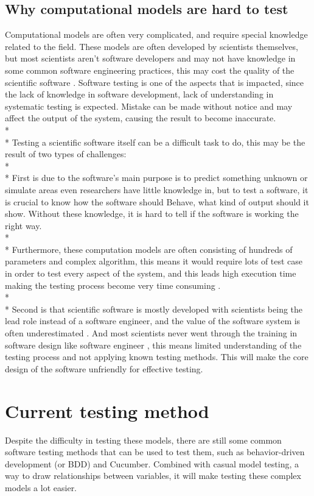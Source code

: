 \subsection{Why computational models are hard to test}
Computational models are often very complicated, and require special knowledge related to the field. These models are often developed by scientists themselves, but most scientists aren’t software developers and may not have knowledge in some common software engineering practices, this may cost the quality of the scientific software \cite{Reference6}. Software testing is one of the aspects that is impacted, since the lack of knowledge in software development, lack of understanding in systematic testing is expected. Mistake can be made without notice and may affect the output of the system, causing the result to become inaccurate.\\*\\*
Testing a scientific software itself can be a difficult task to do, this may be the result of two types of challenges: \\*\\*
First is due to the software’s main purpose is to predict something unknown or simulate areas even researchers have little knowledge in, but to test a software, it is crucial to know how the software should Behave, what kind of output should it show. 
Without these knowledge, it is hard to tell if the software is working the right way. \\*\\*
Furthermore, these computation models are often consisting of hundreds of parameters and complex algorithm, this means it would require lots of test case in order to test every aspect of the system, and this leads high execution time making the testing process become very time consuming \cite{Reference6}.\\*\\*
Second is that scientific software is mostly developed with scientists being the lead role instead of a software engineer, and the value of the software system is often underestimated \cite{Reference6}. And most scientists never went through the training in software design like software engineer \cite{Reference7}, this means limited understanding of the testing process and not applying known testing methods. This will make the core design of the software unfriendly for effective testing.

\section{Current testing method}
Despite the difficulty in testing these models, there are still some common software testing methods that can be used to test them, such as behavior-driven development (or BDD) and Cucumber. Combined with casual model testing, a way to draw relationships between variables, it will make testing these complex models a lot easier.

